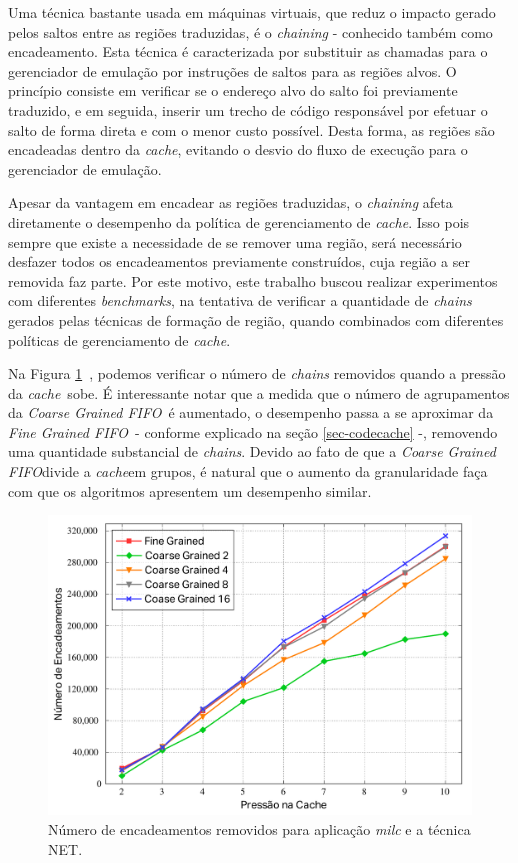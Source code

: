 \documentclass[12pt,twoside]{article}
\newcommand{\cache}{\emph{cache}}
\newcommand{\finefifo}{\emph{Fine Grained FIFO}}
\newcommand{\coarsefifo}{\emph{Coarse Grained FIFO}}
\begin{document}
Uma técnica bastante usada em máquinas virtuais, que reduz o impacto gerado pelos saltos entre as regiões traduzidas, é o \emph{chaining} - conhecido também como encadeamento. Esta técnica é caracterizada por substituir as chamadas para o gerenciador de emulação por instruções de saltos para as regiões alvos. O princípio consiste em verificar se o endereço alvo do salto foi previamente traduzido, e em seguida, inserir um trecho de código
responsável por efetuar o salto de forma direta e com o menor custo possível. Desta forma, as regiões são encadeadas dentro da \cache, evitando o desvio do fluxo de execução para o gerenciador de emulação.

Apesar da vantagem em encadear as regiões traduzidas, o \emph{chaining} afeta diretamente o desempenho da política de gerenciamento de \cache. Isso pois sempre que existe a necessidade de se remover uma região, será necessário desfazer todos os encadeamentos previamente construídos, cuja região a ser removida faz parte. Por este motivo, este trabalho buscou realizar experimentos com diferentes \emph{benchmarks}, na tentativa de verificar a quantidade de \emph{chains} gerados pelas técnicas de formação de região, quando combinados com diferentes políticas de gerenciamento de \cache.

Na Figura \ref{fig-milc-chain}~, podemos verificar o número de \emph{chains} removidos quando a pressão da \cache~sobe. É interessante notar que a medida que o número de agrupamentos da \coarsefifo~é aumentado, o desempenho passa a se aproximar da \finefifo~- conforme explicado na seção \ref{sec-codecache} -, removendo uma quantidade substancial de \emph{chains}. Devido ao fato de que a \coarsefifo divide a \cache em grupos, é natural que o aumento da granularidade faça com que os algoritmos apresentem um desempenho similar.

\begin{figure}[!ht]
\centering
\includegraphics[scale=0.4]{./figs/net-milc-chaining}
\caption{Número de encadeamentos removidos para aplicação \emph{milc} e a técnica NET.}
\label{fig-milc-chain}
\end{figure}
\end{document}
